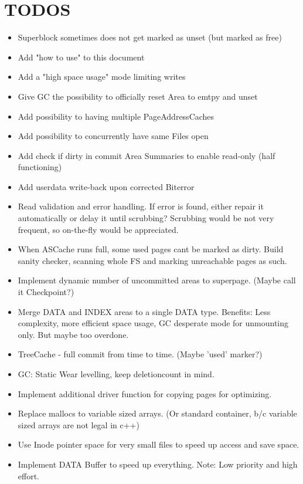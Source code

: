 \section{TODOS}
\begin{itemize}
    \item Superblock sometimes does not get marked as unset (but marked as free)
    \item Add "how to use" to this document
    \item Add a "high space usage" mode limiting writes 
    \item Give GC the possibility to officially reset Area to emtpy and unset
    \item Add possibility to having multiple PageAddressCaches
    \item Add possibility to concurrently have same Files open
    \item Add check if dirty in commit Area Summaries to enable read-only (half functioning)
    \item Add userdata write-back upon corrected Biterror
    \item Read validation and error handling. If error is found, either repair it automatically or delay it until scrubbing? Scrubbing would be not very frequent, so on-the-fly would be appreciated.
	\item When ASCache runs full, some used pages cant be marked as dirty. Build sanity checker, scanning whole FS and marking unreachable pages as such.
	\item Implement dynamic number of uncommitted areas to superpage. (Maybe call it Checkpoint?)
	\item Merge DATA and INDEX areas to a single DATA type. Benefits: Less complexity, more efficient space usage, GC desperate mode for unmounting only. But maybe too overdone.
	\item TreeCache - full commit from time to time. (Maybe 'used' marker?)
	\item GC: Static Wear levelling, keep deletioncount in mind.
	\item Implement additional driver function for copying pages for optimizing.
	\item Replace mallocs to variable sized arrays. (Or standard container, b/c variable sized arrays are not legal in c++)
	\item Use Inode pointer space for very small files to speed up access and save space.
	\item Implement DATA Buffer to speed up everything. Note: Low priority and high effort.
\end{itemize}
